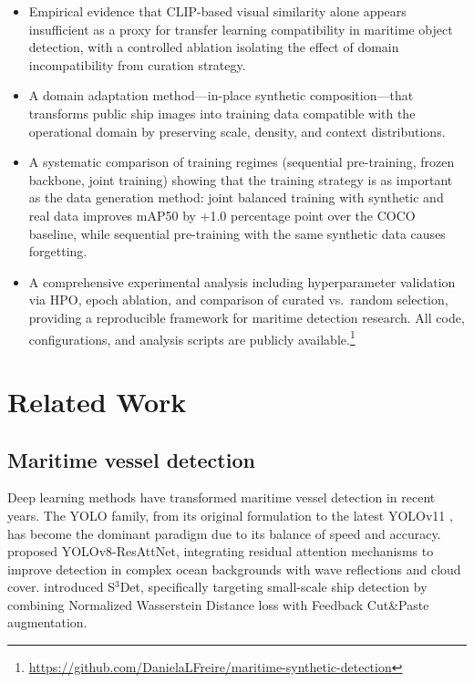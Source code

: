 \documentclass[a4paper,fleqn]{cas-dc}
\begin{document}
\begin{itemize}
    \item Empirical evidence that CLIP-based visual similarity alone appears insufficient as a proxy for transfer learning compatibility in maritime object detection, with a controlled ablation isolating the effect of domain incompatibility from curation strategy.
    \item A domain adaptation method---in-place synthetic composition---that transforms public ship images into training data compatible with the operational domain by preserving scale, density, and context distributions.
    \item A systematic comparison of training regimes (sequential pre-training, frozen backbone, joint training) showing that the training strategy is as important as the data generation method: joint balanced training with synthetic and real data improves mAP50 by +1.0 percentage point over the COCO baseline, while sequential pre-training with the same synthetic data causes forgetting.
    \item A comprehensive experimental analysis including hyperparameter validation via HPO, epoch ablation, and comparison of curated vs.\ random selection, providing a reproducible framework for maritime detection research. All code, configurations, and analysis scripts are publicly available.\footnote{\url{https://github.com/DanielaLFreire/maritime-synthetic-detection}}
\end{itemize}

\section{Related Work}\label{sec:related}

\subsection{Maritime vessel detection}

Deep learning methods have transformed maritime vessel detection in recent years. The YOLO family, from its original formulation \citep{redmon2016you} to the latest YOLOv11 \citep{jocher2023ultralytics}, has become the dominant paradigm due to its balance of speed and accuracy. \citet{liu2025yolov8resattnet} proposed YOLOv8-ResAttNet, integrating residual attention mechanisms to improve detection in complex ocean backgrounds with wave reflections and cloud cover. \citet{li2024s3det} introduced S$^3$Det, specifically targeting small-scale ship detection by combining Normalized Wasserstein Distance loss with Feedback Cut\&Paste augmentation.
\end{document}
